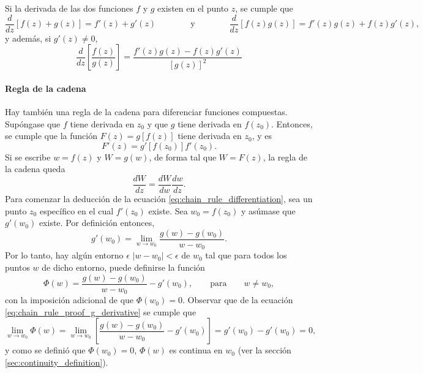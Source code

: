 \documentclass[a4paper]{report}
\begin{document}
Si la derivada de las dos funciones \(f\) y \(g\) existen en el punto \(z\), se cumple que
\[
 \frac{d}{dz}[f(z)+g(z)]=f'(z)+g'(z)\qquad\qquad\textrm{y}\qquad\qquad
 \frac{d}{dz}[f(z)g(z)]=f'(z)g(z)+f(z)g'(z),
\]
y además, si \(g'(z)\neq0\),
\[
 \frac{d}{dz}\left[\frac{f(z)}{g(z)}\right]=\frac{f'(z)g(z)-f(z)g'(z)}{[g(z)]^2}
\]

\paragraph{Regla de la cadena} Hay también una regla de la cadena para diferenciar funciones compuestas. Supóngase que \(f\) tiene derivada en \(z_0\) y que \(g\) tiene derivada en \(f(z_0)\). Entonces, se cumple que la función \(F(z)=g[f(z)]\) tiene derivada en \(z_0\), y es
\begin{equation}\label{eq:chain_rule_differentiation}
 F'(z)=g'[f(z_0)]f'(z_0). 
\end{equation}
Si se escribe \(w=f(z)\) y \(W=g(w)\), de forma tal que \(W=F(z)\), la regla de la cadena queda
\[
 \frac{dW}{dz}=\frac{dW}{dw}\frac{dw}{dz}.
\]
Para comenzar la deducción de la ecuación \ref{eq:chain_rule_differentiation}, sea un punto \(z_0\) específico en el cual \(f'(z_0)\) existe. Sea \(w_0=f(z_0)\) y asúmase que \(g'(w_0)\) existe. Por definición entonces,
\begin{equation}\label{eq:chain_rule_proof_g_derivative}
 g'(w_0)=\lim_{w\to w_0}\frac{g(w)-g(w_0)}{w-w_0}.
\end{equation}
Por lo tanto, hay algún entorno \(\epsilon\) \(|w-w_0|<\epsilon\) de \(w_0\) tal que para todos los puntos \(w\) de dicho entorno, puede definirse la función
\begin{equation}\label{eq:chain_rule_proof_phi}
 \Phi(w)=\dfrac{g(w)-g(w_0)}{w-w_0}-g'(w_0),\qquad\textrm{para}\qquad w\neq w_0,
\end{equation}
con la imposición adicional de que \(\Phi(w_0)=0\). Observar que de la ecuación \ref{eq:chain_rule_proof_g_derivative} se cumple que 
\[
 \lim_{w\to w_0}\Phi(w)=\lim_{w\to w_0}\left[\frac{g(w)-g(w_0)}{w-w_0}-g'(w_0)\right]
 =g'(w_0)-g'(w_0)=0,
\]
y como se definió que \(\Phi(w_0)=0\), \(\Phi(w)\) es continua en \(w_0\) (ver la sección \ref{sec:continuity_definition}).
\end{document}
